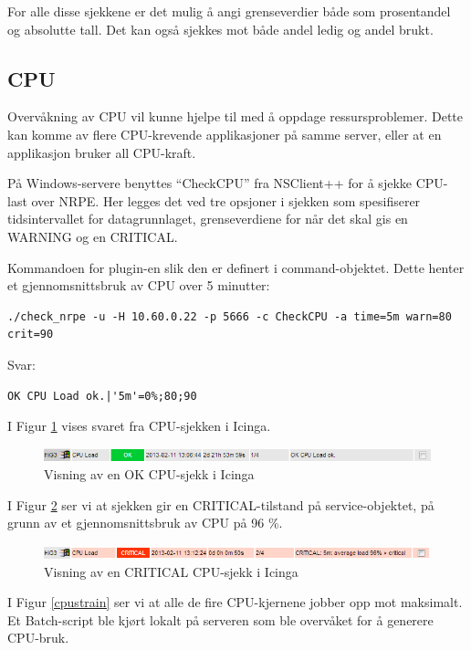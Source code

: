 For alle disse sjekkene er det mulig å angi grenseverdier både som prosentandel og absolutte tall. Det kan også sjekkes mot både andel ledig og andel brukt. 
\subsection{CPU}
Overvåkning av CPU vil kunne hjelpe til med å oppdage ressursproblemer. Dette kan komme av flere CPU-krevende applikasjoner på samme server, eller at en applikasjon bruker all CPU-kraft.  

På Windows-servere benyttes ``CheckCPU'' fra NSClient++ for å sjekke CPU-last over NRPE. Her legges det ved tre opsjoner i sjekken som spesifiserer tidsintervallet for datagrunnlaget, grenseverdiene for når det skal gis en WARNING og en CRITICAL.

Kommandoen for plugin-en slik den er definert i command-objektet. Dette henter et gjennomsnittsbruk av CPU over 5 minutter: 

\begin{lstlisting}[style=example]
./check_nrpe -u -H 10.60.0.22 -p 5666 -c CheckCPU -a time=5m warn=80 crit=90
\end{lstlisting}
Svar:
\begin{lstlisting}[style=example]
OK CPU Load ok.|'5m'=0%;80;90
\end{lstlisting}

I Figur \ref{cpuok} vises svaret fra CPU-sjekken i Icinga. 
\begin{figure}[H]
    \centering
    \includegraphics[scale=0.8]{img/HiG3_cpu_ok}
    \caption{Visning av en OK CPU-sjekk i Icinga}
    \label{cpuok}
\end{figure}

I Figur \ref{cpucritical} ser vi at sjekken gir en CRITICAL-tilstand på service-objektet, på grunn av et gjennomsnittsbruk av CPU på 96 \%. 
\begin{figure}[H]
    \centering
    \includegraphics[scale=0.8]{img/HiG3_cpu_critical}
    \caption{Visning av en CRITICAL CPU-sjekk i Icinga}
    \label{cpucritical}
\end{figure}

I Figur \ref{cpustrain} ser vi at alle de fire CPU-kjernene jobber opp mot maksimalt. Et Batch-script ble kjørt lokalt på serveren som ble overvåket for å generere CPU-bruk.

